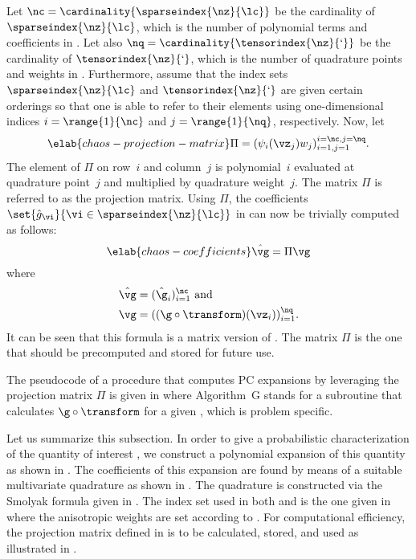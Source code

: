 Let $\nc = \cardinality{\sparseindex{\nz}{\lc}}$ be the cardinality of
$\sparseindex{\nz}{\lc}$, which is the number of polynomial terms and
coefficients in . Let also $\nq =
\cardinality{\tensorindex{\nz}{\lq}}$ be the cardinality of
$\tensorindex{\nz}{\lq}$, which is the number of quadrature points and weights
in . Furthermore, assume that the index sets
$\sparseindex{\nz}{\lc}$ and $\tensorindex{\nz}{\lq}$ are given certain
orderings so that one is able to refer to their elements using one-dimensional
indices $i = \range{1}{\nc}$ and $j = \range{1}{\nq}$, respectively. Now, let
\begin{equation} \elab{chaos-projection-matrix}
  \Pi = (\psi_i(\vz_j) w_j)_{i = 1, j = 1}^{i = \nc, j = \nq}.
\end{equation}
The element of $\Pi$ on row~$i$ and column~$j$ is polynomial~$i$ evaluated at
quadrature point~$j$ and multiplied by quadrature weight~$j$. The matrix $\Pi$
is referred to as the projection matrix. Using $\Pi$, the coefficients
$\set{\hat{g}_{\vi}}{\vi \in \sparseindex{\nz}{\lc}}$ in 
can now be trivially computed as follows:
\begin{equation} \elab{chaos-coefficients}
  \hat{\vg} = \Pi \vg
\end{equation}
where
\begin{align*}
  & \hat{\vg} = (\hat{\g}_i)_{i = 1}^\nc \text{ and} \\
  & \vg = ((\g \circ \transform)(\vz_i))_{i = 1}^\nq.
\end{align*}
It can be seen that this formula is a matrix version of
. The matrix $\Pi$ is the one that should be precomputed
and stored for future use.

The pseudocode of a procedure that computes \ac{PC} expansions by leveraging the
projection matrix $\Pi$ is given in  where Algorithm~G
stands for a subroutine that calculates $\g \circ \transform$ for a given \vz,
which is problem specific.

Let us summarize this subsection. In order to give a probabilistic
characterization of the quantity of interest \g, we construct a polynomial
expansion of this quantity as shown in . The coefficients
of this expansion are found by means of a suitable multivariate quadrature as
shown in . The quadrature is constructed via the Smolyak
formula given in . The index set used in both
 and  is the one given in
 where the anisotropic weights are set
according to . For computational efficiency, the
projection matrix defined in  is to be calculated,
stored, and used as illustrated in .

